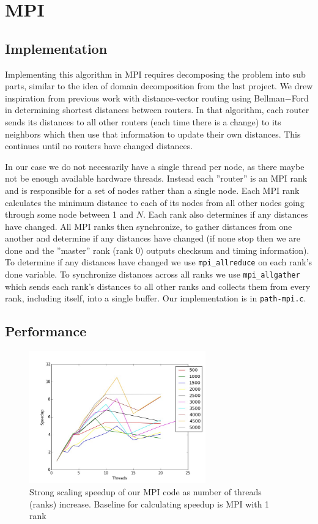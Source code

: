 \section{MPI}\label{sec:mpi}
\subsection{Implementation}
Implementing this algorithm in MPI requires decomposing the problem into sub
parts, similar to the idea of domain decomposition from the last project. We
drew inspiration from previous work with distance-vector routing using
Bellman$-$Ford in determining shortest distances between routers. In that
algorithm, each router sends its distances to all other routers (each time
there is a change) to its neighbors which then use that information to update
their own distances. This continues until no routers have changed distances.

In our case we do not necessarily have a single thread per node, as there maybe
not be enough available hardware threads. Instead each ''router'' is an MPI
rank and is responsible for a set of nodes rather than a single node. Each MPI
rank calculates the minimum distance to each of its nodes from all other nodes
going through some node between 1 and $N$. Each rank also determines if any
distances have changed. All MPI ranks then synchronize, to gather distances
from one another and determine if any distances have changed (if none stop then
we are done and the ''master'' rank (rank 0) outputs checksum and timing
information). To determine if any distances have changed we use
\texttt{mpi\_allreduce} on each rank's done variable. To synchronize distances
across all ranks we use \texttt{mpi\_allgather} which sends each rank's
distances to all other ranks and collects them from every rank, including
itself, into a single buffer. Our implementation is in \texttt{path-mpi.c}.

\subsection{Performance}
\begin{figure}[h]
  \centering
  \includegraphics[width=0.68\textwidth] {plots/1}
  \caption{%
    Strong scaling speedup of our MPI code as number of threads (ranks)
    increase. Baseline for calculating speedup is MPI with 1 rank
  }
  \label{aload0}
\end{figure}

